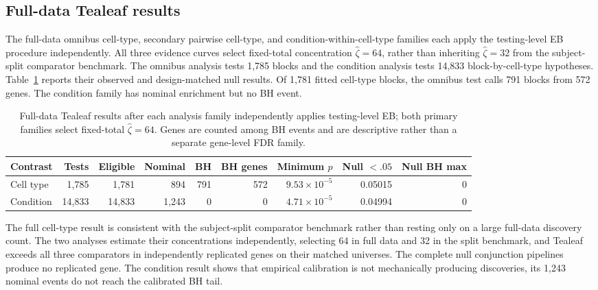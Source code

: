 \documentclass[11pt]{article}
\begin{document}
\subsection*{Full-data Tealeaf results}

The full-data omnibus cell-type, secondary pairwise cell-type, and condition-within-cell-type families each apply the testing-level EB procedure independently. All three evidence curves select fixed-total concentration \(\widehat\zeta=64\), rather than inheriting \(\widehat\zeta=32\) from the subject-split comparator benchmark. The omnibus analysis tests 1,785 blocks and the condition analysis tests 14,833 block-by-cell-type hypotheses. Table~\ref{tab:primary-local-path-results} reports their observed and design-matched null results. Of 1,781 fitted cell-type blocks, the omnibus test calls 791 blocks from 572 genes. The condition family has nominal enrichment but no BH event.

\begin{table}[H]
\centering
\scriptsize
\caption{Full-data Tealeaf results after each analysis family independently applies testing-level EB; both primary families select fixed-total \(\widehat\zeta=64\). Genes are counted among BH events and are descriptive rather than a separate gene-level FDR family.}
\label{tab:primary-local-path-results}
\begin{tabular}{lrrrrrrrr}
\toprule
Contrast & Tests & Eligible & Nominal & BH & BH genes & Minimum \(p\) & Null $<.05$ & Null BH max\\
\midrule
Cell type & 1,785 & 1,781 & 894 & 791 & 572 & $9.53\times10^{-5}$ & 0.05015 & 0\\
Condition & 14,833 & 14,833 & 1,243 & 0 & 0 & $4.71\times10^{-5}$ & 0.04994 & 0\\
\bottomrule
\end{tabular}
\end{table}

The full cell-type result is consistent with the subject-split comparator benchmark rather than resting only on a large full-data discovery count. The two analyses estimate their concentrations independently, selecting 64 in full data and 32 in the split benchmark, and Tealeaf exceeds all three comparators in independently replicated genes on their matched universes. The complete null conjunction pipelines produce no replicated gene. The condition result shows that empirical calibration is not mechanically producing discoveries, its 1,243 nominal events do not reach the calibrated BH tail.
\end{document}
